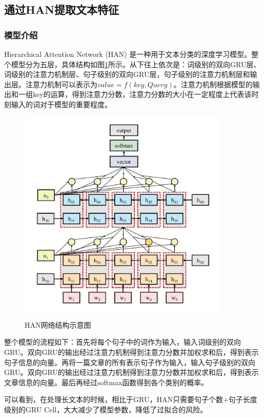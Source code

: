 \documentclass[lang=cn,a4paper]{elegantpaper}
\begin{document}
\subsection{通过HAN提取文本特征} 

\subsubsection{模型介绍}

Hierarchical Attention Network (HAN) 是一种用于文本分类的深度学习模型\citep{yang2016hierarchical}。整个模型分为五层，具体结构如图\ref{fig:HAN}所示。从下往上依次是：词级别的双向GRU层、词级别的注意力机制层、句子级别的双向GRU层，句子级别的注意力机制层和输出层。注意力机制可以表示为$value = f(key,Query)$。注意力机制根据模型的输出和一组key的运算，得到注意力分数，注意力分数的大小在一定程度上代表该时刻输入的词对于模型的重要程度。

\begin{figure}[!htbp]
  \centering
  \includegraphics[width=4in]{image/HAN.pdf}
  \caption{HAN网络结构示意图}
  \label{fig:HAN}
\end{figure}

整个模型的流程如下：首先将每个句子中的词作为输入，输入词级别的双向GRU。双向GRU的输出经过注意力机制得到注意力分数并加权求和后，得到表示句子信息的向量。再将一篇文章的所有表示句子作为输入，输入句子级别的双向GRU。双向GRU的输出经过注意力机制得到注意力分数并加权求和后，得到表示文章信息的向量。最后再经过softmax函数得到各个类别的概率。

可以看到，在处理长文本的时候，相比于GRU，HAN只需要句子个数+句子长度级别的GRU Cell，大大减少了模型参数，降低了过拟合的风险。
\end{document}
